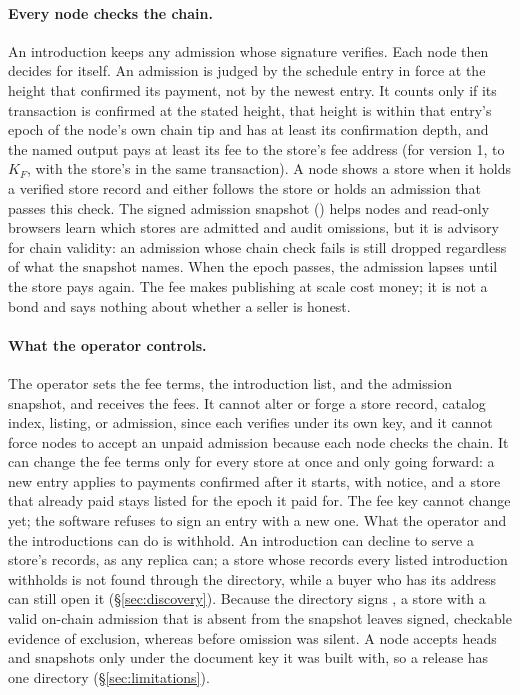 \paragraph{Every node checks the chain.} An introduction keeps any admission whose signature verifies. Each node then decides for itself. An admission is judged by the schedule entry in force at the height that confirmed its payment, not by the newest entry. It counts only if its transaction is confirmed at the stated height, that height is within that entry's epoch of the node's own chain tip and has at least its confirmation depth, and the named output pays at least its fee to the store's fee address (for version 1, to $K_F$, with the store's  in the same transaction). A node shows a store when it holds a verified store record and either follows the store or holds an admission that passes this check. The signed admission snapshot () helps nodes and read-only browsers learn which stores are admitted and audit omissions, but it is advisory for chain validity: an admission whose chain check fails is still dropped regardless of what the snapshot names. When the epoch passes, the admission lapses until the store pays again. The fee makes publishing at scale cost money; it is not a bond and says nothing about whether a seller is honest.

\paragraph{What the operator controls.} The operator sets the fee terms, the introduction list, and the admission snapshot, and receives the fees. It cannot alter or forge a store record, catalog index, listing, or admission, since each verifies under its own key, and it cannot force nodes to accept an unpaid admission because each node checks the chain. It can change the fee terms only for every store at once and only going forward: a new entry applies to payments confirmed after it starts, with notice, and a store that already paid stays listed for the epoch it paid for. The fee key cannot change yet; the software refuses to sign an entry with a new one. What the operator and the introductions can do is withhold. An introduction can decline to serve a store's records, as any replica can; a store whose records every listed introduction withholds is not found through the directory, while a buyer who has its address can still open it (\S\ref{sec:discovery}). Because the directory signs , a store with a valid on-chain admission that is absent from the snapshot leaves signed, checkable evidence of exclusion, whereas before  omission was silent. A node accepts heads and snapshots only under the document key it was built with, so a release has one directory (\S\ref{sec:limitations}).
